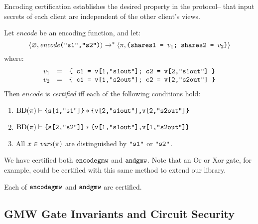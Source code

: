 Encoding certification establishes the desired property in the protocol-- that
input secrets of each client are independent of the other client's views. 
\begin{definition}
  \label{definition-gmwencode-certification}
  Let $\mathit{encode}$ be an encoding function, and let:
  $$
  \langle \varnothing,\mathit{encode}\texttt{("s1","s2")} \rangle \xrightarrow{}^{*}
  \langle \pi,\texttt{\{shares1 = }v_1\texttt{; shares2 = }v_2\texttt{\}} \rangle
  $$
  where:
  $$
  \begin{array}{rcl}
    v_1 &=& \texttt{\{ c1 = v[1,"s1out"]; c2 = v[2,"s1out"] \}}\\
    v_2 &=& \texttt{\{ c1 = v[1,"s2out"]; c2 = v[2,"s2out"] \}}
  \end{array}
  $$
  Then $\mathit{encode}$ is \emph{certified} iff each of the following conditions hold:
  \begin{enumerate}[\hspace{5mm}i.]
  \item $\mathrm{BD}(\pi) \vdash \texttt{\{s[1,"s1"]\}} * \texttt{\{v[2,"s1out"],v[2,"s2out"]\}}$
  \item $\mathrm{BD}(\pi) \vdash \texttt{\{s[2,"s2"]\}} * \texttt{\{v[1,"s1out"],v[1,"s2out"]\}}$
  \item All $x \in \mathit{vars}(\pi)$ are distinguished by $\texttt{"s1"}$ or $\texttt{"s2"}$. 
  \end{enumerate}
  \end{definition}

We have certified both $\texttt{encodegmw}$ and $\texttt{andgmw}$. Note that
an Or or Xor gate, for example, could be certified with this same
method to extend our library.
\begin{lemma}
  \label{lemma-gmw-certification}
  Each of $\texttt{encodegmw}$ and $\texttt{andgmw}$ are certified.
\end{lemma}

\subsection{GMW Gate Invariants and Circuit Security}

